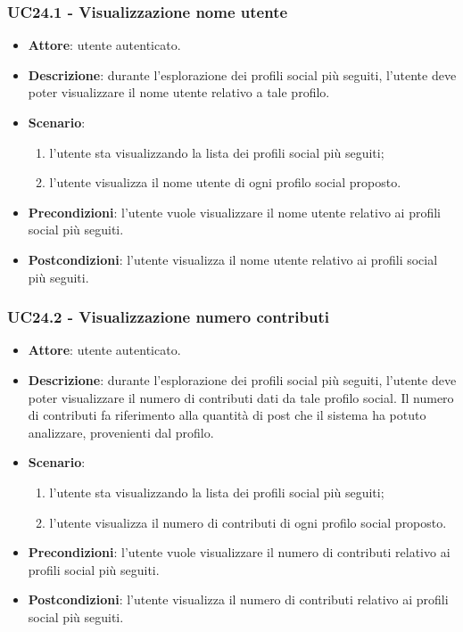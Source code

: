\subsubsection{UC24.1 - Visualizzazione nome utente}
\begin{itemize}
    \item \textbf{Attore}: utente autenticato.
    \item \textbf{Descrizione}: durante l'esplorazione dei profili social più seguiti,
     l'utente deve poter visualizzare il nome utente relativo a tale profilo.
    \item \textbf{Scenario}:
    \begin{enumerate}
        \item l'utente sta visualizzando la lista dei profili social più seguiti;
        \item l'utente visualizza il nome utente di ogni profilo social proposto.
    \end{enumerate}
    \item \textbf{Precondizioni}: l'utente vuole visualizzare il nome utente relativo ai  profili social più seguiti.
    \item \textbf{Postcondizioni}: l'utente visualizza il nome utente relativo ai  profili social più seguiti.
\end{itemize}

\subsubsection{UC24.2 - Visualizzazione numero contributi}
\begin{itemize}
    \item \textbf{Attore}: utente autenticato.
    \item \textbf{Descrizione}: durante l'esplorazione dei profili social più seguiti,
    l'utente deve poter visualizzare il numero di contributi dati da tale profilo social.
    Il numero di contributi fa riferimento alla quantità di post che il sistema ha potuto
    analizzare, provenienti dal profilo.
    \item \textbf{Scenario}:
    \begin{enumerate}
        \item l'utente sta visualizzando la lista dei profili social più seguiti;
        \item l'utente visualizza il numero di contributi di ogni profilo social proposto.
    \end{enumerate}
    \item \textbf{Precondizioni}: l'utente vuole visualizzare il numero di contributi relativo ai  profili social più seguiti.
    \item \textbf{Postcondizioni}: l'utente visualizza il numero di contributi relativo ai  profili social più seguiti.
\end{itemize}

